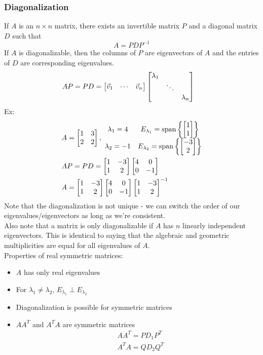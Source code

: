 \documentclass[11pt, fleqn]{article}
\begin{document}
\subsubsection{Diagonalization}
If $A$ is an $n\times n$ matrix, there exists an invertible matrix $P$ and a diagonal matrix $D$ such that
$$A=PDP^{-1}$$
If $A$ is diagonalizable, then the columns of $P$ are eigenvectors of $A$ and the entries of $D$ are corresponding eigenvalues.
\begin{align*}
    &AP=PD=\matrixx{\vec{v}_1 & \cdots & \vec{v}_n}\matrixx{\lambda_1 & & \\ & \ddots & \\ & & \lambda_n}
\end{align*}
Ex:
\begin{align*}
    &A=\matrixx{1 & 3\\ 2 & 2},\ \begin{matrix}\lambda_1=4 & E_{\lambda_1}=\spann\brcurly{\matrixx{1\\1}}\\ \lambda_2 = -1 & E_{\lambda_2}=\spann\brcurly{\matrixx{-3\\2}}\end{matrix}\\
    &AP=PD=\matrixx{1 & -3\\ 1 & 2}\matrixx{4 & 0\\ 0 & -1}\\
    &A=\matrixx{1 & -3\\ 1 & 2}\matrixx{4 & 0\\ 0 & -1}\matrixx{1 & -3\\ 1 & 2}^{-1}
\end{align*}
Note that the diagonalization is not unique - we can switch the order of our eigenvalues/eigenvectors as long as we're consistent.\\
Also note that a matrix is only diagonalizable if $A$ has $n$ linearly independent eigenvectors. This is identical to saying that the algebraic and geometric multiplicities are equal for all eigenvalues of $A$.\\
Properties of real symmetric matrices:
\begin{itemize}
    \item $A$ has only real eigenvalues
    \item For $\lambda_1\neq\lambda_2$, $E_{\lambda_1}\perp E_{\lambda_2}$
    \item Diagonalization is possible for symmetric matrices
    \item $AA^T$ and $A^TA$ are symmetric matrices
    \begin{align*}
        &AA^T=PD_1P^T\\
        &A^TA=QD_2Q^T
    \end{align*}
\end{itemize}
\end{document}
